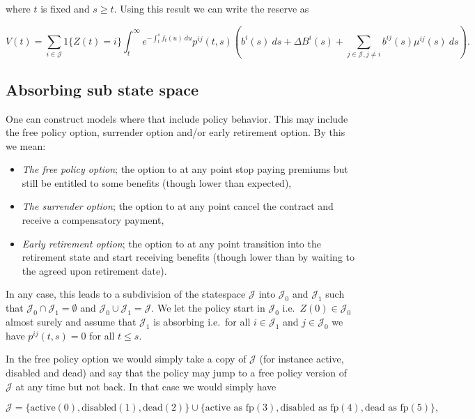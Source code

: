 \documentclass[a4paper,10pt,openany]{book}
\providecommand{\tightlist}{%
 \setlength{\itemsep}{0pt}\setlength{\parskip}{0pt}}
\begin{document}
where \(t\) is fixed and \(s\ge t\). Using this result we can write the reserve as

\[
V(t)=\sum_{i\in \mathcal J}1\{Z(t)=i\}\int_t^\infty e^{-\int_t^s f_t(u)\ du}p^{ij}(t,s)\left(b^i(s)\ ds+\Delta B^i(s)+\sum_{j\in\mathcal J, j\ne i}b^{ij}(s)\mu^{ij}(s)\ ds\right).
\]

\hypertarget{absorbing-sub-state-space}{%
\subsection{Absorbing sub state space}\label{absorbing-sub-state-space}}

One can construct models where that include policy behavior. This may include the free policy option, surrender option and/or early retirement option. By this we mean:

\begin{itemize}
\tightlist
\item
  \emph{The free policy option}; the option to at any point stop paying premiums but still be entitled to some benefits (though lower than expected),
\item
  \emph{The surrender option}; the option to at any point cancel the contract and receive a compensatory payment,
\item
  \emph{Early retirement option}; the option to at any point transition into the retirement state and start receiving benefits (though lower than by waiting to the agreed upon retirement date).
\end{itemize}

In any case, this leads to a subdivision of the statespace \(\mathcal J\) into \(\mathcal J_0\) and \(\mathcal J_1\) such that \(\mathcal J_0\cap \mathcal J_1=\emptyset\) and \(\mathcal J_0\cup\mathcal J_1=\mathcal J\). We let the policy start in \(\mathcal J_0\) i.e.~\(Z(0)\in\mathcal J_0\) almost surely and assume that \(\mathcal J_1\) is absorbing i.e.~for all \(i\in \mathcal J_1\) and \(j\in\mathcal J_0\) we have \(p^{ij}(t,s)=0\) for all \(t\le s\).

In the free policy option we would simply take a copy of \(\mathcal J\) (for instance active, disabled and dead) and say that the policy may jump to a free policy version of \(\mathcal J\) at any time but not back. In that case we would simply have

\[
\mathcal J=\{\text{active}(0),\text{disabled}(1),\text{dead}(2)\}\cup\{\text{active as fp}(3),\text{disabled as fp}(4),\text{dead as fp}(5)\},
\]
\end{document}
